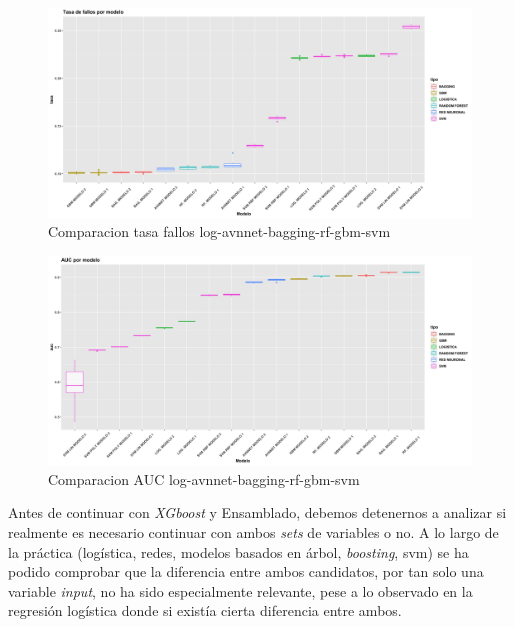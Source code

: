 \documentclass[
]{article}
\begin{document}
\begin{figure}[h!]

{\centering \includegraphics[width=0.99\linewidth,height=0.99\textheight,]{./charts/comparativas/06_log_avnnet_bagging_rf_gbm_svm_tasa} 

}

\caption{Comparacion tasa fallos log-avnnet-bagging-rf-gbm-svm}\label{fig:unnamed-chunk-128}
\end{figure}
\begin{figure}[h!]

{\centering \includegraphics[width=0.99\linewidth,height=0.99\textheight,]{./charts/comparativas/06_log_avnnet_bagging_rf_gbm_svm_auc} 

}

\caption{Comparacion AUC log-avnnet-bagging-rf-gbm-svm}\label{fig:unnamed-chunk-129}
\end{figure}

Antes de continuar con \emph{XGboost} y Ensamblado, debemos detenernos a
analizar si realmente es necesario continuar con ambos \emph{sets} de
variables o no. A lo largo de la práctica (logística, redes, modelos
basados en árbol, \emph{boosting}, svm) se ha podido comprobar que la
diferencia entre ambos candidatos, por tan solo una variable
\emph{input}, no ha sido especialmente relevante, pese a lo observado en
la regresión logística donde si existía cierta diferencia entre ambos.
\end{document}

